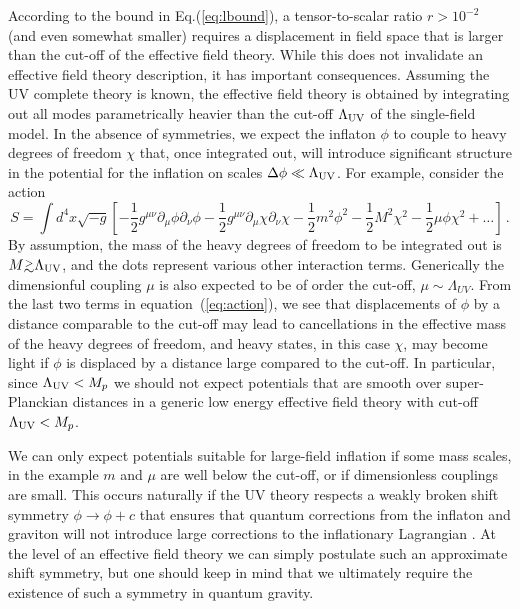 According to the bound in Eq.(\ref{eq:lbound}), a tensor-to-scalar ratio $r>10^{-2}$ (and even somewhat smaller) requires a displacement in field space that is larger than the cut-off of the effective field theory. While this does not invalidate an effective field theory description, it has important consequences. Assuming the UV complete theory is known, the effective field theory is obtained by integrating out all modes parametrically heavier than the cut-off $\Lambda_{\rm UV}$ of the single-field model. In the absence of symmetries, we expect the inflaton $\phi$ to couple to heavy degrees of freedom $\chi$ that, once integrated out, will introduce significant structure in the potential for the inflation on scales $\Delta\phi\ll \Lambda_{\rm UV}$. For example, consider the action
\begin{equation}\label{eq:action}
S=\int d^4x\sqrt{-g}\left[-\frac12g^{\mu\nu}\partial_\mu\phi\partial_\nu\phi-\frac12g^{\mu\nu}\partial_\mu\chi\partial_\nu\chi-\frac12m^2\phi^2-\frac12M^2\chi^2-\frac12\mu\phi\chi^2+\dots\right]\,.
\end{equation}
By assumption, the mass of the heavy degrees of freedom to be integrated out is $M\gtrsim\Lambda_{\rm UV}$, and the dots represent various other interaction terms. Generically the dimensionful coupling $\mu$ is also expected to be of order the cut-off, $\mu\sim\Lambda_{UV}$. From the last two terms in equation~(\ref{eq:action}), we see that displacements of $\phi$ by a distance comparable to the cut-off may lead to cancellations in the effective mass of the heavy degrees of freedom, and heavy states, in this case $\chi$, may become light if $\phi$ is displaced by a distance large compared to the cut-off. In particular, since $\Lambda_{\rm UV}<M_p$ we should not expect potentials that are smooth over super-Planckian distances in a generic low energy effective field theory with cut-off $\Lambda_{\rm UV}<M_p$. 

We can only expect potentials suitable for large-field inflation if some mass scales, in the example $m$ and $\mu$ are well below the cut-off, or if dimensionless couplings are small. This occurs naturally if the UV theory respects a weakly broken shift symmetry $\phi\rightarrow\phi+c$ that ensures that quantum corrections from the inflaton and graviton will not introduce large corrections to the inflationary Lagrangian \cite{Linde:2005ht, Kaloper:2011jz, Csaki:2014bua,Kaplan:2015fuy,Choi:2015fiu}. At the level of an effective field theory we can simply postulate such an approximate shift symmetry, but one should keep in mind that we ultimately require the existence of such a symmetry in quantum gravity. 

